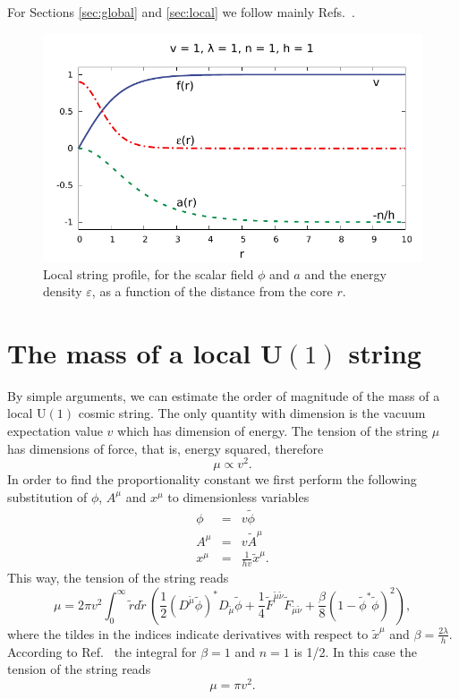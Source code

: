 For Sections \ref{sec:global} and \ref{sec:local} we follow mainly Refs.\ \cite{Hindmarsh1995,Vilenkin1994}.
\begin{figure}
	\centering
	\includegraphics[scale=1]{./figures/local_str.pdf}
	\caption{Local string profile, for the scalar field $\phi$ and $a$ and the energy density $\varepsilon$, as a function of the distance from the core $r$.}
	\label{fig:local_str}
\end{figure}

\section{The mass of a local U$(1)$ string}
By simple arguments, we can estimate the order of magnitude of the mass of a local U$(1)$ cosmic string. The only quantity with dimension is the vacuum expectation value $v$ which has dimension of energy. The tension of the string $\mu$ has dimensions of force, that is, energy squared, therefore
\begin{equation}
	\mu \propto v^2.
\end{equation} 
In order to find the proportionality constant we first perform the following substitution of  $\phi$, $A^{\mu}$ and $x^{\mu}$ to dimensionless variables
\begin{eqnarray*}
	\phi & = & v\tilde \phi \\
	A^{\mu} & = & v\tilde A^{\mu}    \\
	x^{\mu} & = & \frac{1}{hv}\tilde x^{\mu} .
\end{eqnarray*}
This way, the tension of the string reads
\begin{equation}
	\mu = 2\pi v^2 \int_0^{\infty} \tilde rd\tilde r \, \left(\frac{1}{2}\left( D^{\tilde\mu} \tilde\phi\right)^{*} D_{\tilde\mu} \tilde\phi +\frac{1}{4} \tilde{F}^{\tilde\mu\tilde\nu}\tilde{F}_{\tilde\mu\tilde\nu} +\frac{\beta}{8}(1- \tilde{\phi}^*\tilde{\phi})^2\right),
\end{equation}
where the tildes in the indices indicate derivatives with respect to $\tilde x^{\mu}$ and $\beta = \frac{2\lambda}{h}$. According to Ref.\ \cite{bogo1975} the integral for $\beta = 1$ and $n=1$ is 1/2. In this case the tension of the string reads 
\begin{equation}
	\mu = \pi v^2.
\end{equation}

